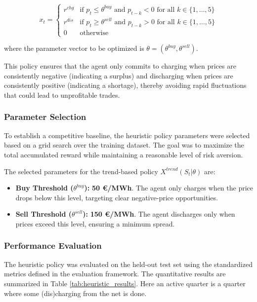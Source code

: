         \[
        x_t = 
        \begin{cases} 
            r^{chg} & \text{if } p_t \le \theta^{buy} \text{ and } p_{t-k} < 0 \text{ for all } k \in \{1, \dots, 5\} \\
            r^{dis} & \text{if } p_t \ge \theta^{sell} \text{ and } p_{t-k} > 0 \text{ for all } k \in \{1, \dots, 5\} \\
            0 & \text{otherwise}
        \end{cases}
        \]
        
        \noindent where the parameter vector to be optimized is $\theta = (\theta^{buy}, \theta^{sell})$.
        
        This policy ensures that the agent only commits to charging when prices are consistently negative (indicating a surplus) and discharging when prices are consistently positive (indicating a shortage), thereby avoiding rapid fluctuations that could lead to unprofitable trades.
        
                
        \subsubsection{Parameter Selection}
            To establish a competitive baseline, the heuristic policy parameters were selected based on a grid search over the training dataset. The goal was to maximize the total accumulated reward while maintaining a reasonable level of risk aversion. 
                
            The selected parameters for the trend-based policy $X^{trend}(S_t | \theta)$ are:
            \begin{itemize}
                \item \textbf{Buy Threshold ($\theta^{buy}$):} \textbf{50 €/MWh}. The agent only charges when the price drops below this level, targeting clear negative-price opportunities.
                \item \textbf{Sell Threshold ($\theta^{sell}$):} \textbf{150 €/MWh}. The agent discharges only when prices exceed this level, ensuring a minimum spread.
            \end{itemize}
                
        \subsubsection{Performance Evaluation}
            The heuristic policy was evaluated on the held-out test set using the standardized metrics defined in the evaluation framework. The quantitative results are summarized in Table \ref{tab:heuristic_results}. Here an active quarter is a quarter where some (dis)charging from the net is done.
                
